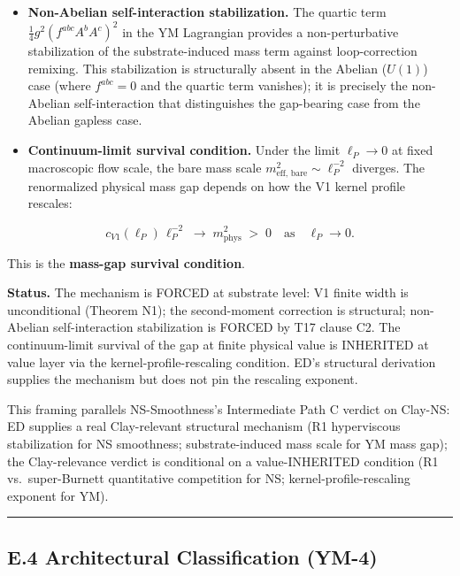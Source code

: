 \documentclass[
]{article}
\providecommand{\tightlist}{%
  \setlength{\itemsep}{0pt}\setlength{\parskip}{0pt}}
\begin{document}
\begin{itemize}
\tightlist
\item
  \textbf{Non-Abelian self-interaction stabilization.} The quartic term
  \(\tfrac{1}{4}g^2(f^{abc}A^b A^c)^2\) in the YM Lagrangian provides a
  non-perturbative stabilization of the substrate-induced mass term
  against loop-correction remixing. This stabilization is structurally
  absent in the Abelian (\(U(1)\)) case (where \(f^{abc} = 0\) and the
  quartic term vanishes); it is precisely the non-Abelian
  self-interaction that distinguishes the gap-bearing case from the
  Abelian gapless case.
\item
  \textbf{Continuum-limit survival condition.} Under the limit
  \(\ell_P \to 0\) at fixed macroscopic flow scale, the bare mass scale
  \(m_\mathrm{eff,\,bare}^2 \sim \ell_P^{-2}\) diverges. The
  renormalized physical mass gap depends on how the V1 kernel profile
  rescales:
\end{itemize}

\[\boxed{\;c_{V1}(\ell_P)\,\ell_P^{-2} \;\longrightarrow\; m_\mathrm{phys}^2 \;>\; 0 \quad\text{as}\quad \ell_P \to 0.\;}\]

This is the \textbf{mass-gap survival condition}.

\textbf{Status.} The mechanism is FORCED at substrate level: V1 finite
width is unconditional (Theorem N1); the second-moment correction is
structural; non-Abelian self-interaction stabilization is FORCED by T17
clause C2. The continuum-limit survival of the gap at finite physical
value is INHERITED at value layer via the kernel-profile-rescaling
condition. ED's structural derivation supplies the mechanism but does
not pin the rescaling exponent.

This framing parallels NS-Smoothness's Intermediate Path C verdict on
Clay-NS: ED supplies a real Clay-relevant structural mechanism (R1
hyperviscous stabilization for NS smoothness; substrate-induced mass
scale for YM mass gap); the Clay-relevance verdict is conditional on a
value-INHERITED condition (R1 vs.~super-Burnett quantitative competition
for NS; kernel-profile-rescaling exponent for YM).

\begin{center}\rule{0.5\linewidth}{0.5pt}\end{center}

\subsection{E.4 Architectural Classification
(YM-4)}\label{e.4-architectural-classification-ym-4}
\end{document}
